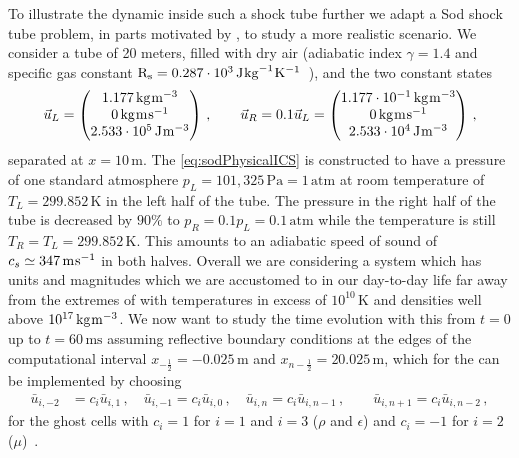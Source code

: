 To illustrate the dynamic inside such a shock tube further we adapt a Sod shock tube problem, in parts motivated by , to study a more realistic scenario.
We consider a tube of 20 meters, filled with dry air (adiabatic index $\gamma=1.4$ and specific gas constant ${\mathrm{R}_\mathrm{s}= 0.287\cdot 10^3\,\mathrm{J}\mkern1.0mu\mathrm{kg}^{-1}\mkern1.0mu\mathrm{K}^{-1}}$~\cite{dry-air-properties}), and the two constant states
\begin{align}
\vec{u}_L=\begin{pmatrix}
	1.177\,\mathrm{kg}\mkern1.0mu\mathrm{m}^{-3}\\
	0\,\mathrm{kg}\mkern1.0mu\mathrm{m}\mkern1.0mu\mathrm{s}^{-1}\\
	2.533 \cdot 10^5\,\mathrm{J}\mkern1.0mu\mathrm{m}^{-3}
\end{pmatrix}\,,\qquad \vec{u}_R=0.1 \vec{u}_L = \begin{pmatrix}
	1.177 \cdot 10^{-1}\,\mathrm{kg}\mkern1.0mu\mathrm{m}^{-3}\\
	0\,\mathrm{kg}\mkern1.0mu\mathrm{m}\mkern1.0mu\mathrm{s}^{-1}\\
	2.533 \cdot 10^4\,\mathrm{J}\mkern1.0mu\mathrm{m}^{-3}
\end{pmatrix}\, ,
\label{eq:sodPhysicalICS}
\end{align}
separated at $x=10\,\mathrm{m}$.
The \ic{} \eqref{eq:sodPhysicalICS} is constructed to have a pressure of one standard atmosphere $p_L=101,325\,\mathrm{Pa}=1\,\mathrm{atm}$ at room temperature of $T_L=299.852\,\mathrm{K}$ in the left half of the tube.
The pressure in the right half of the tube is decreased by $90\%$ to $p_R=0.1p_L=0.1\, \mathrm{atm}$ while the temperature is still  $T_R=T_L=299.852\,\mathrm{K}$.
This amounts to an adiabatic speed of sound of $c_s\simeq 347\,\mathrm{m}\mkern1.0mu\mathrm{s}^{-1}$ in both halves.
Overall we are considering a system which has units and magnitudes which we are accustomed to in our day-to-day life \dash{} far away from the extremes of \hep{} with temperatures in excess of $10^{10}\,\mathrm{K}$ and densities well above $10^{17}\,\mathrm{kg}\mkern1.0mu\mathrm{m}^{-3}$.
We now want to study the time evolution with this \ic{} from $t=0$ up to $t=60\,\mathrm{ms}$ assuming reflective boundary conditions at the edges of the computational interval
${x_{-\frac{1}{2}}=-0.025\,\mathrm{m}}$ and ${x_{n-\frac{1}{2}}=20.025\,\mathrm{m}}$, which for the \eulereqs{} can be implemented by choosing
\begin{align}
	\bar{u}_{i,-2}&=c_i\bar{u}_{i,1}\,,\quad \bar{u}_{i,-1}=c_i\bar{u}_{i,0}\,,\quad
	\bar{u}_{i,n}=c_i\bar{u}_{i,n-1}\,,\quad\quad \bar{u}_{i,n+1}=c_i\bar{u}_{i,n-2}\,,
	\label{eq:eulerReflectiveBC}
\end{align}
for the ghost cells with $c_i=1$ for $i=1$ and $i=3$ ($\rho$ and $\epsilon$) and $c_i=-1$ for $i=2$ ($\mu$)~\cite{SpringelLectureNotes}.

